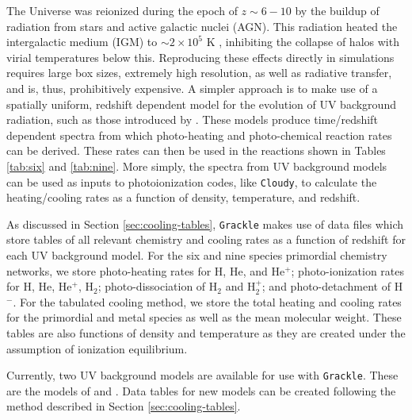 The Universe was reionized during the epoch of $z \sim 6-10$ by the
buildup of radiation from stars and active galactic nuclei (AGN).
This radiation heated the intergalactic medium (IGM) to $\sim 2 \times
10^{5}$ K \citep[e.g.][]{2000MNRAS.318..817S}, inhibiting the collapse
of halos with virial temperatures below this.  Reproducing these
effects directly in simulations requires large box sizes, extremely
high resolution, as well as radiative transfer, and is, thus,
prohibitively expensive.  A simpler approach is to make use of a
spatially uniform, redshift dependent model for the evolution of UV
background radiation, such as those introduced by
\citet{1996ApJ...461...20H}.  These models produce time/redshift
dependent spectra from which photo-heating and photo-chemical reaction
rates can be derived.  These rates can then be used in the reactions
shown in Tables \ref{tab:six} and \ref{tab:nine}.  More simply, the
spectra from UV background models can be used as inputs to
photoionization codes, like \texttt{Cloudy}, to calculate the
heating/cooling rates as a function of density, temperature, and
redshift.

As discussed in Section \ref{sec:cooling-tables}, \texttt{Grackle} makes use of
data files which store tables of all relevant chemistry and cooling
rates as a function of redshift for each UV background model.  For the
six and nine species primordial chemistry networks, we store
photo-heating rates for H, He, and He$^{+}$; photo-ionization rates
for H, He, He$^{+}$, H$_{2}$; photo-dissociation of H$_{2}$ and
H$_{2}^{+}$; and photo-detachment of H$^{-}$.  For the tabulated
cooling method, we store the total heating and cooling rates for the
primordial and metal species as well as the mean molecular weight.
These tables are also functions of density and temperature as they are
created under the assumption of ionization equilibrium.

Currently, two UV background models are available for use with
\texttt{Grackle}.  These are the models of \citet{2009ApJ...703.1416F} and
\citet{2012ApJ...746..125H}.  Data tables for new models can be
created following the method described in Section
\ref{sec:cooling-tables}.

